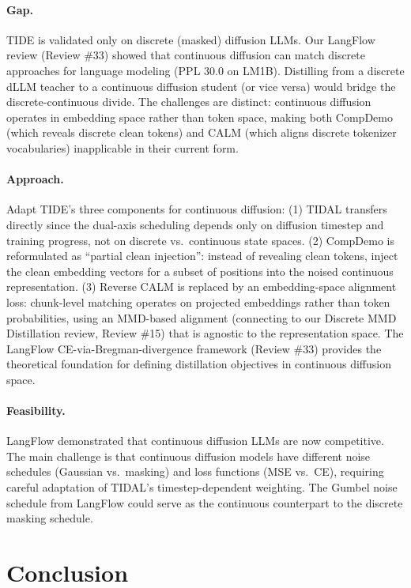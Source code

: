 \documentclass[11pt]{article}
\begin{document}
\paragraph{Gap.}
TIDE is validated only on discrete (masked) diffusion LLMs. Our LangFlow review (Review \#33) showed that continuous diffusion can match discrete approaches for language modeling (PPL 30.0 on LM1B). Distilling from a discrete dLLM teacher to a continuous diffusion student (or vice versa) would bridge the discrete-continuous divide. The challenges are distinct: continuous diffusion operates in embedding space rather than token space, making both CompDemo (which reveals discrete clean tokens) and CALM (which aligns discrete tokenizer vocabularies) inapplicable in their current form.

\paragraph{Approach.}
Adapt TIDE's three components for continuous diffusion: (1) TIDAL transfers directly since the dual-axis scheduling depends only on diffusion timestep and training progress, not on discrete vs.\ continuous state spaces. (2) CompDemo is reformulated as ``partial clean injection'': instead of revealing clean tokens, inject the clean embedding vectors for a subset of positions into the noised continuous representation. (3) Reverse CALM is replaced by an embedding-space alignment loss: chunk-level matching operates on projected embeddings rather than token probabilities, using an MMD-based alignment (connecting to our Discrete MMD Distillation review, Review \#15) that is agnostic to the representation space. The LangFlow CE-via-Bregman-divergence framework (Review \#33) provides the theoretical foundation for defining distillation objectives in continuous diffusion space.

\paragraph{Feasibility.}
LangFlow demonstrated that continuous diffusion LLMs are now competitive. The main challenge is that continuous diffusion models have different noise schedules (Gaussian vs.\ masking) and loss functions (MSE vs.\ CE), requiring careful adaptation of TIDAL's timestep-dependent weighting. The Gumbel noise schedule from LangFlow could serve as the continuous counterpart to the discrete masking schedule.

\section{Conclusion}
\end{document}
